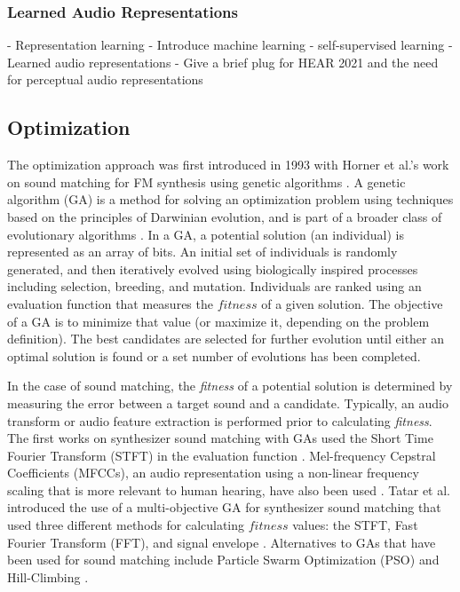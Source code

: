 \subsubsection{Learned Audio Representations}
- Representation learning \cite{bengio2013representation}
- Introduce machine learning
- self-supervised learning
- Learned audio representations
- Give a brief plug for HEAR 2021 and the need for perceptual audio representations

\subsection{Optimization}
The optimization approach was first introduced in 1993 with Horner et al.'s work on sound matching for FM synthesis using genetic algorithms \cite{horner1993machine}. A genetic algorithm (GA) is a method for solving an optimization problem using techniques based on the principles of Darwinian evolution, and is part of a broader class of evolutionary algorithms \cite{whitley1994genetic}. In a GA, a potential solution (an individual) is represented as an array of bits. An initial set of individuals is randomly generated, and then iteratively evolved using biologically inspired processes including selection, breeding, and mutation. Individuals are ranked using an evaluation function that measures the $fitness$ of a given solution. The objective of a GA is to minimize that value (or maximize it, depending on the problem definition). The best candidates are selected for further evolution until either an optimal solution is found or a set number of evolutions has been completed.

In the case of sound matching, the \textit{fitness} of a potential solution is determined by measuring the error between a target sound and a candidate. Typically, an audio transform or audio feature extraction is performed prior to calculating \textit{fitness}. The first works on synthesizer sound matching with GAs used the Short Time Fourier Transform (STFT) in the evaluation function \cite{horner1993machine, horner1995wavetable}. Mel-frequency Cepstral Coefficients (MFCCs), an audio representation using a non-linear frequency scaling that is more relevant to human hearing, have also been used \cite{yee2008synthbot, roth2011comparison, macret2014automatic, smith2017play}. Tatar et al. introduced the use of a multi-objective GA for synthesizer sound matching that used three different methods for calculating $fitness$ values: the STFT, Fast Fourier Transform (FFT), and signal envelope \cite{tatar2016automatic}. Alternatives to GAs that have been used for sound matching include Particle Swarm Optimization (PSO) \cite{heise2009automatic} and Hill-Climbing \cite{roth2011comparison, luke2019stochastic}.

